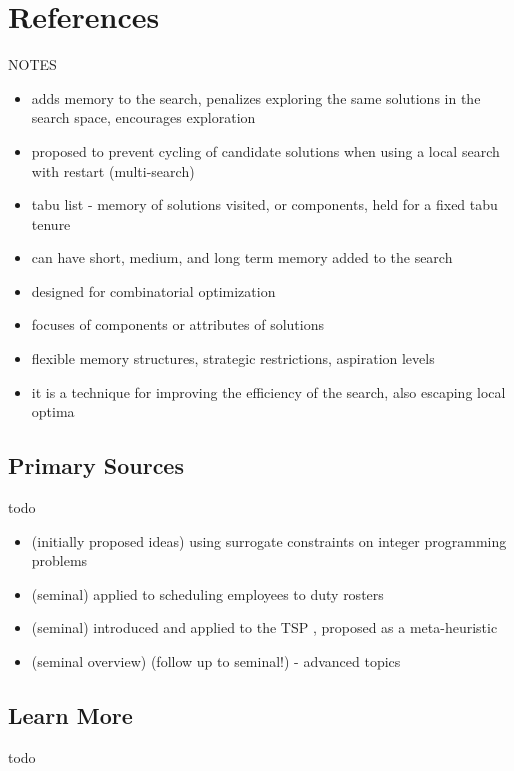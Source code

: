 \documentclass[a4paper, 11pt]{article}
\begin{document}
\section{References}
\label{sec:references}

NOTES
\begin{itemize}
	\item adds memory to the search, penalizes exploring the same solutions in the search space, encourages exploration
	\item proposed to prevent cycling of candidate solutions when using a local search with restart (multi-search)
	\item tabu list - memory of solutions visited, or components, held for a fixed tabu tenure 
	\item can have short, medium, and long term memory added to the search
	\item designed for combinatorial optimization
	\item focuses of components or attributes of solutions
	\item flexible memory structures, strategic restrictions, aspiration levels
	\item it is a technique for improving the efficiency of the search, also escaping local optima
\end{itemize}

% 
% 
\subsection{Primary Sources}
todo

\begin{itemize}
	\item (initially proposed ideas) using surrogate constraints on integer programming problems \cite{Glover1977}
	\item (seminal) applied to scheduling employees to duty rosters \cite{Glover1986a}
	\item (seminal) introduced and applied to the TSP \cite{Glover1986}, proposed as a meta-heuristic
	\item (seminal overview) \cite{Glover1989} (follow up to seminal!) \cite{Glover1990} - advanced topics
\end{itemize}

% 
% 
\subsection{Learn More}
todo
\end{document}
